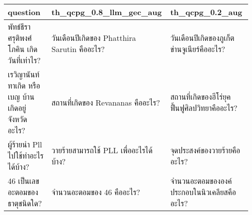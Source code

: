 \begin{tabular}{lll}
\toprule
question & th_qcpg_0.8_llm_gec_aug & th_qcpg_0.2_aug \\
\midrule
พัทธ์ธีรา ศรุติพงศ์โภคิน เกิดวันที่เท่าไร? & วันเดือนปีเกิดของ Phatthira Sarutin คืออะไร? & วันเดือนปีเกิดของภูเก็ตข่านจูเนียร์คืออะไร? \\
เรวิญานันท์ ทาเกิด หรือ เบญ บ้านเกิดอยู่จังหวัดอะไร? & สถานที่เกิดของ Revananas คืออะไร? & สถานที่เกิดของฮีโร่ยุคฟื้นฟูศิลปวิทยาคืออะไร? \\
ผู้ร้ายนำ Pll ไปใช้ทำอะไรได้บ้าง? & วายร้ายสามารถใช้ PLL เพื่ออะไรได้บ้าง? & จุดประสงค์ของวายร้ายคืออะไร? \\
46 เป็นเลขอะตอมของธาตุชนิดใด? & จำนวนอะตอมของ 46 คืออะไร? & จำนวนอะตอมขององค์ประกอบในนิวเคลียสคืออะไร? \\
\bottomrule
\end{tabular}
